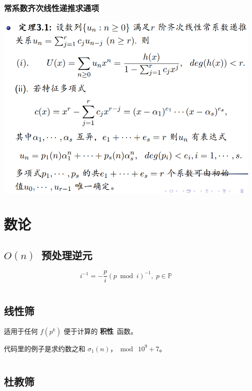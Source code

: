 \documentclass[a4paper, twoside]{article}
\begin{document}
\begin{multicols}{2}
				\subsubsection{常系数齐次线性递推求通项}
					\includegraphics[width=\linewidth]{../src/math/线性齐次线性常系数递推.png}

		\newpage
		\section{数论}

			\subsection{$O(n)$~预处理逆元}
				$$ i ^ {-1} = - \frac p i \left( p \bmod i \right) ^ {-1},\; p \in \mathbb{P}$$

				\inputminted{cpp}{../src/numbertheory/O(n)求逆元.cpp}

			\subsection{线性筛}
				适用于任何 $f(p^k)$ 便于计算的 \textbf{积性}\ 函数。

				代码里的例子是求约数之和 $\sigma_1(n)$，$\bmod\ 10^9 + 7$。

				\inputminted{cpp}{../src/numbertheory/扩展线性筛.cpp}

			\subsection{杜教筛}
				
			

\end{multicols}
\end{document}
